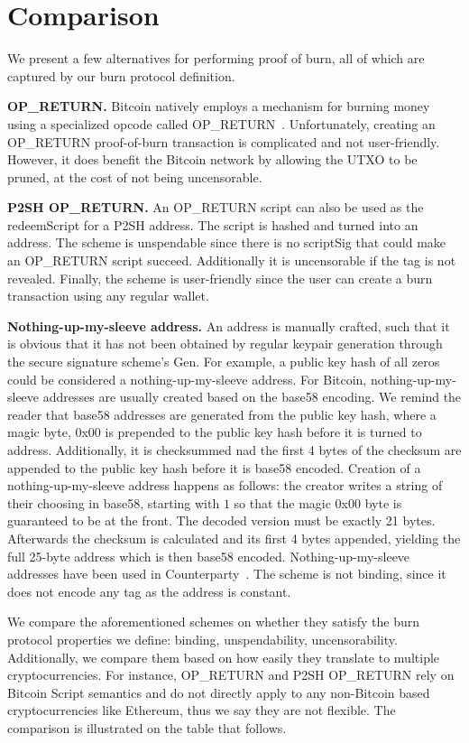 \section{Comparison}

We present a few alternatives for performing proof of burn, all of which are captured by our burn protocol definition.

\noindent
\textbf{OP\_RETURN.}
Bitcoin natively employs a mechanism for burning money using a specialized
opcode called OP\_RETURN~\cite{bartoletti2017analysis}. Unfortunately,
creating an OP\_RETURN proof-of-burn transaction is complicated and not
user-friendly. However, it does benefit the Bitcoin network by allowing the UTXO
to be pruned, at the cost of not being uncensorable.

\noindent
\textbf{P2SH OP\_RETURN.}
An OP\_RETURN script can also be used as the redeemScript for a P2SH address. The script is hashed and turned into an address. The scheme is unspendable since there is no scriptSig that could make an OP\_RETURN script succeed. Additionally it is uncensorable if the tag is not revealed. Finally, the scheme is user-friendly since the user can create a burn transaction using any regular wallet.

\noindent
\textbf{Nothing-up-my-sleeve address.}
An address is manually crafted, such that it is obvious that it has not been obtained by regular keypair generation through the secure signature scheme's \textsf{Gen}. For example, a public key hash of all zeros could be considered a nothing-up-my-sleeve address. For Bitcoin, nothing-up-my-sleeve addresses are usually created based on the base58 encoding. We remind the reader that base58 addresses are generated from the public key hash, where a magic byte, 0x00 is prepended to the public key hash before it is turned to address. Additionally, it is checksummed nad the first 4 bytes of the checksum are appended to the public key hash before it is base58 encoded. Creation of a nothing-up-my-sleeve address happens as follows: the creator writes a string of their choosing in base58, starting with $1$ so that the magic 0x00 byte is guaranteed to be at the front. The decoded version must be exactly 21 bytes. Afterwards the checksum is calculated and its first 4 bytes appended, yielding the full 25-byte address which is then base58 encoded. Nothing-up-my-sleeve addresses have been used in Counterparty~\cite{counterparty}. The scheme is not binding, since it does not encode any tag as the address is constant.

We compare the aforementioned schemes on whether they satisfy the burn protocol properties we define: binding, unspendability, uncensorability. Additionally, we compare them based on how easily they translate to multiple cryptocurrencies. For instance, OP\_RETURN and P2SH OP\_RETURN rely on Bitcoin Script semantics and do not directly apply to any non-Bitcoin based cryptocurrencies like Ethereum, thus we say they are not flexible. The comparison is illustrated on the table that follows.

